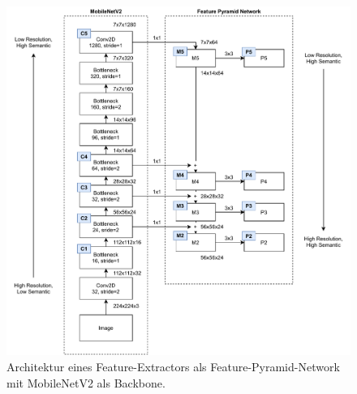 \begin{figure}
    \includegraphics[width=\textwidth]{images/MobileNetV2_FPN.pdf}
    \caption{Architektur eines Feature-Extractors als Feature-Pyramid-Network
    mit MobileNetV2 als Backbone.}
    \label{fig:mobilenetv2-fpn}
\end{figure}